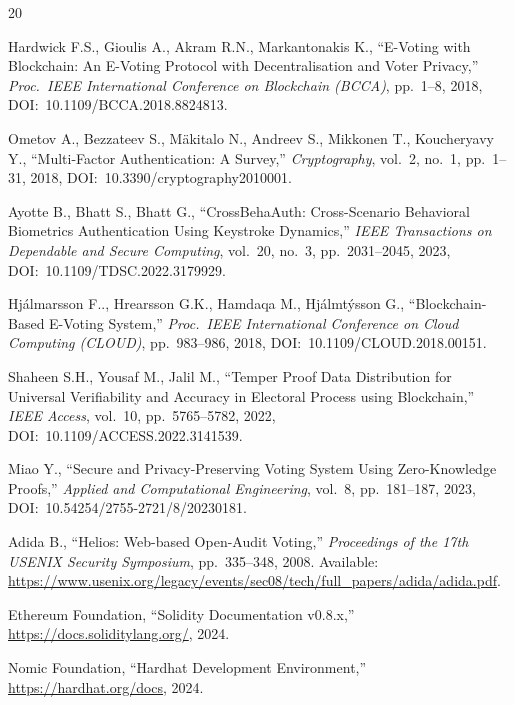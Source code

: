 \documentclass[oneside,a4paper,12pt]{book}
\begin{document}
\begin{thebibliography}{20}

 Hardwick F.S., Gioulis A., Akram R.N., Markantonakis K., ``E-Voting with Blockchain: An E-Voting Protocol with Decentralisation and Voter Privacy,'' \textit{Proc.\ IEEE International Conference on Blockchain (BCCA)}, pp.~1--8, 2018, DOI:~10.1109/BCCA.2018.8824813.

 Ometov A., Bezzateev S., M{\"a}kitalo N., Andreev S., Mikkonen T., Koucheryavy Y., ``Multi-Factor Authentication: A Survey,'' \textit{Cryptography}, vol.~2, no.~1, pp.~1--31, 2018, DOI:~10.3390/cryptography2010001.

 Ayotte B., Bhatt S., Bhatt G., ``CrossBehaAuth: Cross-Scenario Behavioral Biometrics Authentication Using Keystroke Dynamics,'' \textit{IEEE Transactions on Dependable and Secure Computing}, vol.~20, no.~3, pp.~2031--2045, 2023, DOI:~10.1109/TDSC.2022.3179929.

 Hj{\'a}lmarsson F.\TH., Hre{\dh}arsson G.K., Hamdaqa M., Hj{\'a}lmt{\'y}sson G., ``Blockchain-Based E-Voting System,'' \textit{Proc.\ IEEE International Conference on Cloud Computing (CLOUD)}, pp.~983--986, 2018, DOI:~10.1109/CLOUD.2018.00151.

 Shaheen S.H., Yousaf M., Jalil M., ``Temper Proof Data Distribution for Universal Verifiability and Accuracy in Electoral Process using Blockchain,'' \textit{IEEE Access}, vol.~10, pp.~5765--5782, 2022, DOI:~10.1109/ACCESS.2022.3141539.

 Miao Y., ``Secure and Privacy-Preserving Voting System Using Zero-Knowledge Proofs,'' \textit{Applied and Computational Engineering}, vol.~8, pp.~181--187, 2023, DOI:~10.54254/2755-2721/8/20230181.

 Adida B., ``Helios: Web-based Open-Audit Voting,'' \textit{Proceedings of the 17th USENIX Security Symposium}, pp.~335--348, 2008. Available: \url{https://www.usenix.org/legacy/events/sec08/tech/full_papers/adida/adida.pdf}.

 Ethereum Foundation, ``Solidity Documentation v0.8.x,'' \url{https://docs.soliditylang.org/}, 2024.

 Nomic Foundation, ``Hardhat Development Environment,'' \url{https://hardhat.org/docs}, 2024.


\end{thebibliography}
\end{document}
